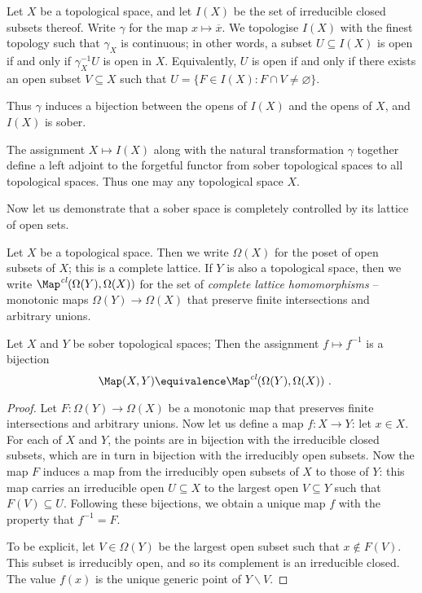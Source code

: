 \begin{cnstr}
	Let $ X $ be a topological space, and let $ I(X) $ be the set of irreducible closed subsets thereof.
	Write $ \gamma $ for the map $ x \mapsto \overline{x} $.
	We topologise $ I(X) $ with the finest topology such that $ \gamma_X $ is continuous;
	in other words, a subset $U \subseteq I(X) $ is open if and only if $ \gamma_X^{-1} U $ is open in $ X $.
	Equivalently, $ U $ is open if and only if there exists an open subset $ V \subseteq X $ such that $ U = \{ F \in I(X) : F \cap V \neq \varnothing \} $.

	Thus $ \gamma $ induces a bijection between the opens of $ I(X) $ and the opens of $ X $, and $ I(X) $ is sober.
	
	The assignment $ X \mapsto I(X) $ along with the natural transformation $ \gamma $ together define a left adjoint to the forgetful functor from sober topological spaces to all topological spaces.
	Thus one may  any topological space $ X $.
\end{cnstr}

Now let us demonstrate that a sober space is completely controlled by its lattice of open sets.

\begin{ntn}
	Let $ X $ be a topological space.
	Then we write $ \Omega(X) $ for the poset of open subsets of $ X $;
	this is a complete lattice.
	If $ Y $ is also a topological space, then we write $ \Map^{\textit{cl}}(\Omega(Y), \Omega(X)) $ for the set of \emph{complete lattice homomorphisms} -- monotonic maps $ \Omega(Y) \to \Omega(X) $ that preserve finite intersections and arbitrary unions.
\end{ntn}

\begin{prp}
	Let $ X $ and $ Y $ be sober topological spaces;
	Then the assignment $ f \mapsto f^{-1} $ is a bijection
	\[
		\Map(X, Y) \equivalence \Map^{\textit{cl}}(\Omega(Y), \Omega(X)) \period
	\]
\end{prp}

\begin{proof}
	Let $ F \colon \Omega(Y) \to \Omega(X) $ be a monotonic map that preserves finite intersections and arbitrary unions.
	Now let us define a map $ f \colon X \to Y $: let $ x \in X $.
	For each of $ X $ and $ Y $, the points are in bijection with the irreducible closed subsets, which are in turn in bijection with the irreducibly open subsets.
	Now the map $ F $ induces a map from the irreducibly open subsets of $ X $ to those of $ Y $:
	this map carries an irreducible open $ U \subseteq X $ to the largest open $ V \subseteq Y $ such that $ F(V) \subseteq U $.
	Following these bijections, we obtain a unique map $ f $ with the property that $ f^{-1} = F $.
	
	To be explicit, let $ V \in \Omega(Y) $ be the largest open subset such that $ x \notin F(V) $.
	This subset is irreducibly open, and so its complement is an irreducible closed.
	The value $ f(x) $ is the unique generic point of $ Y \smallsetminus V $.
\end{proof}

